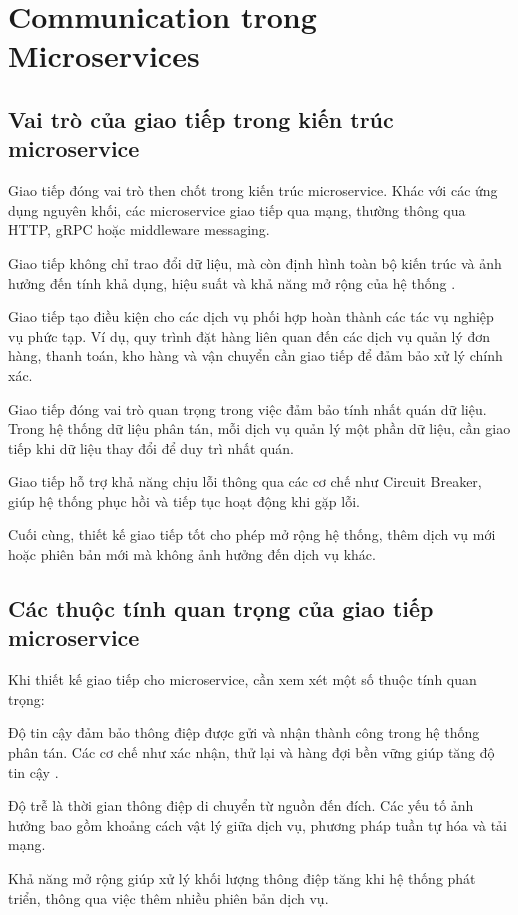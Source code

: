 \section{Communication trong Microservices}

\subsection{Vai trò của giao tiếp trong kiến trúc microservice}
Giao tiếp đóng vai trò then chốt trong kiến trúc microservice. Khác với các ứng
dụng nguyên khối, các microservice giao tiếp qua mạng, thường thông qua HTTP, gRPC hoặc middleware messaging.

Giao tiếp không chỉ trao đổi dữ liệu, mà còn định hình toàn bộ kiến trúc và ảnh hưởng đến tính khả dụng, hiệu suất và khả năng mở rộng của hệ thống \cite{wolff2016}.

Giao tiếp tạo điều kiện cho các dịch vụ phối hợp hoàn thành các tác vụ nghiệp vụ phức tạp. Ví dụ, quy trình đặt hàng liên quan đến các dịch vụ quản lý đơn hàng, thanh toán, kho hàng và vận chuyển cần giao tiếp để đảm bảo xử lý chính xác.

Giao tiếp đóng vai trò quan trọng trong việc đảm bảo tính nhất quán dữ liệu. Trong hệ thống dữ liệu phân tán, mỗi dịch vụ quản lý một phần dữ liệu, cần giao tiếp khi dữ liệu thay đổi để duy trì nhất quán.

Giao tiếp hỗ trợ khả năng chịu lỗi thông qua các cơ chế như Circuit Breaker, giúp hệ thống phục hồi và tiếp tục hoạt động khi gặp lỗi.

Cuối cùng, thiết kế giao tiếp tốt cho phép mở rộng hệ thống, thêm dịch vụ mới hoặc phiên bản mới mà không ảnh hưởng đến dịch vụ khác.

\subsection{Các thuộc tính quan trọng của giao tiếp microservice}
Khi thiết kế giao tiếp cho microservice, cần xem xét một số thuộc tính quan trọng:

Độ tin cậy đảm bảo thông điệp được gửi và nhận thành công trong hệ thống phân tán. Các cơ chế như xác nhận, thử lại và hàng đợi bền vững giúp tăng độ tin cậy \cite{hohpe2004}.

Độ trễ là thời gian thông điệp di chuyển từ nguồn đến đích. Các yếu tố ảnh hưởng bao gồm khoảng cách vật lý giữa dịch vụ, phương pháp tuần tự hóa và tải mạng.

Khả năng mở rộng giúp xử lý khối lượng thông điệp tăng khi hệ thống phát triển, thông qua việc thêm nhiều phiên bản dịch vụ.

